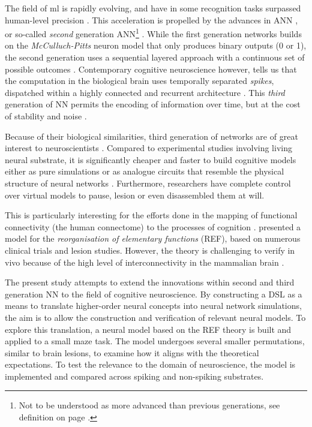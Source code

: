 \documentclass[report.tex]{subfiles}
\begin{document}
The field of \gls{ml} is rapidly evolving, and have in
some recognition tasks surpassed human-level precision
\autocite{Schmidhuber2014}.
This acceleration is propelled by the advances in \gls{ANN}
\autocite{Rumelhart1988, Schmidhuber2014, Nilsson2009}, or
so-called \textit{second} generation \gls{ANN}\footnote{Not to be 
understood as more advanced than previous generations, see definition on page
\pageref{sec:glossary}.} \cite{Maass1997}.
While the first generation networks builds on the \textit{McCulluch-Pitts}
neuron model that only produces binary outputs (0 or 1), the second
generation uses a sequential layered approach with a continuous set of 
possible outcomes \cite{Maass1997, Russel2007}.
Contemporary cognitive neuroscience however, tells us that the computation
in the biological brain uses temporally separated \textit{spikes}, 
dispatched within a highly connected and recurrent architecture 
\cite{Dayan2001, Eliasmith2004}.
This \textit{third} generation of \gls{NN} permits the encoding
of information over time, but at the cost of stability and 
noise \autocite{Maass1997}.

Because of their biological similarities, third generation of
networks are of great interest to neuroscientists
\autocite{Dayan2001,Bruderle2011,Eliasmith2015}.
Compared to experimental studies involving living neural substrate,
it is significantly cheaper and faster to build  cognitive
models either as pure simulations
\autocite{Davison2009, Eliasmith2015} or as analogue circuits
that resemble the physical structure of neural networks
\autocite{Walter2015, Schmitt2017}.
Furthermore, researchers have complete control over virtual models
to pause, lesion or even disassembled them at will.

This is particularly interesting for the efforts done in the
mapping of functional connectivity (the human connectome) to the
processes of cognition \autocite{Eliasmith2015, Mogensen2011}. 
\textcite{Mogensen2011} presented a model for the 
\textit{reorganisation of elementary functions} (REF), based on
numerous clinical trials and lesion studies.
However, the theory is challenging to verify in vivo because of
the high level of interconnectivity in the mammalian brain
\autocite{Hohwy2009, Mogensen2017}.

The present study attempts to extend the innovations within
second and third generation \gls{NN} to the field of
cognitive  neuroscience. 
By constructing a \gls{DSL} as a means to translate higher-order neural
concepts into neural network simulations, the aim is to allow
the construction and verification of relevant neural models.
To explore this translation, a neural model based on the
\gls{REF} theory is built and applied to a small maze task.
The model undergoes several smaller permutations, similar
to brain lesions, to examine how it aligns with the theoretical
expectations.
To test the relevance to the domain of neuroscience, the model
is implemented and compared across spiking and non-spiking
substrates.
\end{document}
